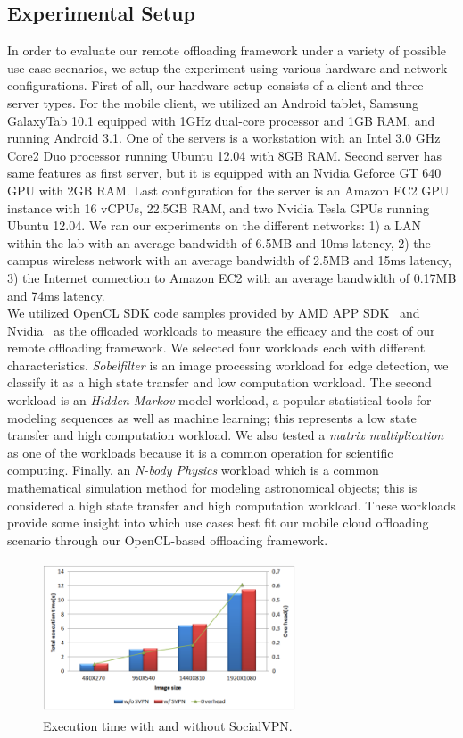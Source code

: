 \documentclass[10pt, conference, compsocconf]{IEEEtran}
\begin{document}
\subsection{Experimental Setup}
%
In order to evaluate our remote offloading framework under a variety of 
possible use case scenarios, we setup the experiment using various hardware
and network configurations.
%
First of all, our hardware setup consists of a client and three server types.
%
For the mobile client, we utilized an Android tablet, Samsung GalaxyTab 10.1 
equipped with 1GHz dual-core processor and 1GB RAM, and running Android 3.1.
%
One of the servers is a workstation with an Intel 3.0 GHz Core2 Duo
processor running Ubuntu 12.04 with 8GB RAM.
%
Second server has same features as first server, but it is equipped with
an Nvidia Geforce GT 640 GPU with 2GB RAM.
%
Last configuration for the server is an Amazon EC2 GPU instance with 16 vCPUs, 22.5GB RAM,
and two Nvidia Tesla GPUs running Ubuntu 12.04.
%
We ran our experiments on the different networks: 1) a LAN within the lab
with an average bandwidth of 6.5MB and 10ms latency, 2) the campus
wireless network with an average bandwidth of 2.5MB and 15ms latency,
3) the Internet connection to Amazon EC2 with an average bandwidth of
0.17MB and 74ms latency.\\
%
\indent We utilized OpenCL SDK code samples provided by AMD APP SDK~\cite{amd} and 
Nvidia~\cite{nvidia} as the offloaded workloads to measure the efficacy and the cost
of our remote offloading framework.
%
We selected four workloads each with different characteristics.
%
\textit{Sobelfilter} is an image processing workload for edge detection, we
classify it as a high state transfer and low computation workload.
%
The second workload is an \textit{Hidden-Markov} model workload, a popular
statistical tools for modeling sequences as well as machine learning;
this represents a low state transfer and high computation workload.
%
We also tested a \textit{matrix multiplication} as one of the workloads because
it is a common operation for scientific computing.
%
Finally, an \textit{N-body Physics} workload which is a common
mathematical simulation method for modeling astronomical objects;
this is considered a high state transfer and high computation workload.
%
These workloads provide some insight into which use cases best fit our
mobile cloud offloading scenario through our OpenCL-based offloading framework.
%
\begin{figure}
\centering
\includegraphics[height=4.5cm, width=7.5cm]{Figure/svpn1}
\caption{Execution time with and without SocialVPN.
}
\end{figure}
\end{document}

